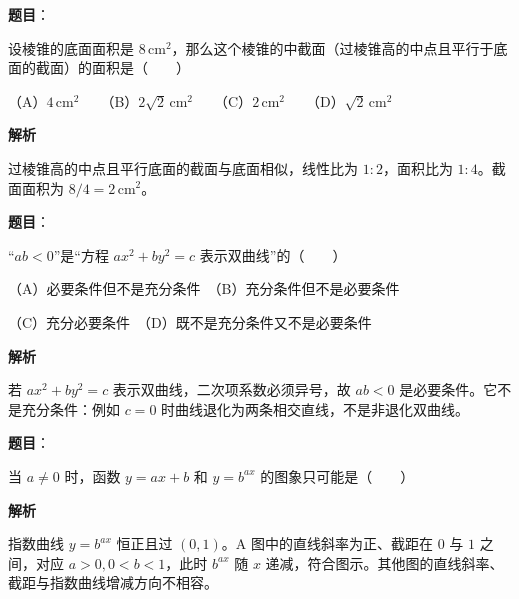 \begin{answer}

\textbf{题目}：

设棱锥的底面面积是 $8\,\mathrm{cm}^2$，那么这个棱锥的中截面（过棱锥高的中点\allowbreak 且平行于底面的截面）的面积是\allowbreak\mbox{（　　）}

（A）$4\,\mathrm{cm}^2$　　（B）$2\sqrt2\,\mathrm{cm}^2$　　（C）$2\,\mathrm{cm}^2$　　（D）$\sqrt2\,\mathrm{cm}^2$

\textbf{解析}

过棱锥高的中点且平行底面的截面与底面相似，线性比为 $1:2$，面积比为 $1:4$。截面面积为 $8/4=2\,\mathrm{cm}^2$。


\end{answer}
\begin{answer}

\textbf{题目}：

“$ab<0$”是“方程 $ax^2+by^2=c$ 表示双曲线”的\mbox{（　　）}

（A）必要条件但不是充分条件　（B）充分条件但不是必要条件

（C）充分必要条件　（D）既不是充分条件又不是必要条件

\textbf{解析}

若 $ax^2+by^2=c$ 表示双曲线，二次项系数必须异号，故 $ab<0$ 是必要条件。它不是充分条件：例如 $c=0$ 时曲线退化为两条相交直线，不是非退化双曲线。


\end{answer}
\begin{answer}

\textbf{题目}：

当 $a\ne0$ 时，函数 $y=ax+b$ 和 $y=b^{ax}$ 的图象只可能是\mbox{（　　）}
\nopagebreak[4]
\begin{center}\end{center}
\nopagebreak[4]
\textbf{解析}

指数曲线 $y=b^{ax}$ 恒正且过 $(0,1)$。A 图中的直线斜率为正、截距在 $0$ 与 $1$ 之间，对应 $a>0,0<b<1$，此时 $b^{ax}$ 随 $x$ 递减，符合图示。其他图的直线斜率、截距与指数曲线增减方向不相容。


\end{answer}
